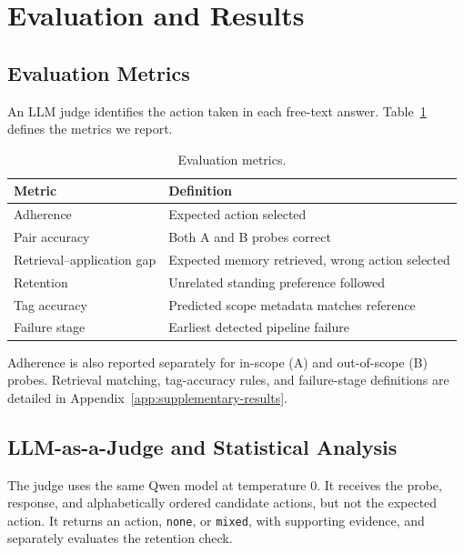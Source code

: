 \section{Evaluation and Results}
\label{sec:results}

\subsection{Evaluation Metrics}
\label{sec:metrics}

An LLM judge identifies the action taken in each
free-text answer. Table~\ref{tab:metrics} defines the
metrics we report.

\begin{table}[t]
\centering
\small
\caption{Evaluation metrics.}
\label{tab:metrics}
\begin{tabularx}{\linewidth}{lX}
\toprule
Metric & Definition \\
\midrule
Adherence & Expected action selected \\
Pair accuracy & Both A and B probes correct \\
Retrieval--application gap &
Expected memory retrieved, wrong action selected \\
Retention & Unrelated standing preference followed \\
Tag accuracy & Predicted scope metadata matches reference \\
Failure stage & Earliest detected pipeline failure \\
\bottomrule
\end{tabularx}
\end{table}

Adherence is also reported separately for in-scope (A)
and out-of-scope (B) probes. Retrieval matching,
tag-accuracy rules, and failure-stage definitions are
detailed in Appendix~\ref{app:supplementary-results}.

\subsection{LLM-as-a-Judge and Statistical Analysis}
\label{sec:judge}

The judge uses the same Qwen model at temperature 0.
It receives the probe, response, and alphabetically
ordered candidate actions, but not the expected action.
It returns an action, \texttt{none}, or \texttt{mixed},
with supporting evidence, and separately evaluates
the retention check.


